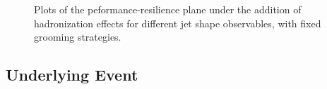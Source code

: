 \documentclass[11pt,letterpaper]{article}
\begin{document}
\begin{figure}
  \caption{Plots of the peformance-resilience plane under the addition of hadronization effects for different jet shape observables, with fixed grooming strategies.}\label{fig:shapes-hadronisation}
\end{figure}






\subsection{Underlying Event}\label{sec:UE}
\end{document}
